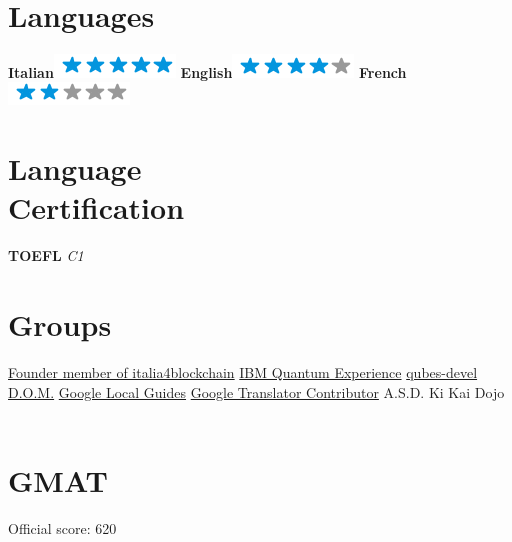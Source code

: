 \documentclass[]{friggeri-cv}
\begin{document}
\begin{aside}
~
~
~
  \section{Languages}
    \textbf{Italian}\includegraphics[scale=0.40]{img/5stars.png}
    \textbf{English}\includegraphics[scale=0.40]{img/4stars.png}
    \textbf{French}\includegraphics[scale=0.40]{img/2stars.png}
    ~
    \section{Language \\ Certification}
    \textbf{TOEFL} \emph{C1}
    \section{Groups}
    \href{https://www.italia4blockchain.it/}{Founder member of italia4blockchain}
    \href{https://quantumexperience.ng.bluemix.net/qstage/#/community}{IBM Quantum Experience}
    \href{https://groups.google.com/forum/#!forum/qubes-devel}{qubes-devel}
    \href{http://www.liceodavinci.tv/sitoLiceo/index.php/offerta-formativa/progetti/126-gruppo-di-informatica-d-o-m}{D.O.M.}
    \href{https://www.google.com/maps/contrib/100973650799154081103/reviews}{Google Local Guides} 
    \href{https://translate.google.com/community}{Google Translator Contributor}
    {A.S.D. Ki Kai Dojo}
    ~
    \section{GMAT}
    {Official score: 620}
    ~
\end{aside}
\end{document}
